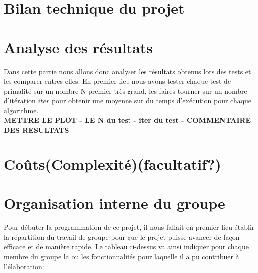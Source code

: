 	\section{Bilan technique du projet}
	
	\section{Analyse des résultats}
	Dans cette partie nous allons donc analyser les résultats obtenus lors des tests et les comparer entres elles. En premier lieu nous avons tester chaque test de primalité sur un nombre N premier très grand, les faires tourner sur un nombre d'itération $iter$ pour obtenir une moyenne sur du temps d'exécution pour chaque algorithme. \\
	
		\textbf{METTRE LE PLOT - LE N du test - iter du test - COMMENTAIRE DES RESULTATS}\\ 
	
	\section{Coûts(Complexité)(facultatif?)}
					
	\section{Organisation interne du groupe}
	Pour débuter la programmation de ce projet, il nous fallait en premier lieu établir la répartition du travail de groupe pour que le projet puisse avancer de façon efficace et de manière rapide. Le tableau ci-dessus va ainsi indiquer pour chaque membre du groupe la ou les fonctionnalités pour laquelle il a pu contribuer à l'élaboration: \\
	
